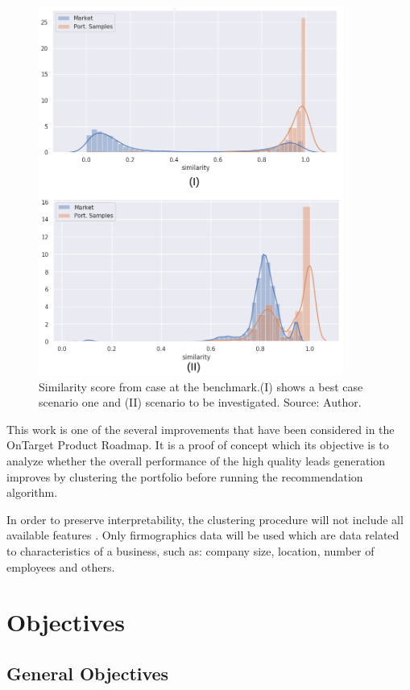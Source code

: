 \begin{figure}
   \centering
   \includegraphics[width=10cm]{fig/ch1-simi-dist-expected-real.png} 
   \caption{Similarity score from case at the benchmark.(I) shows a best case scenario one and (II) scenario to be investigated. Source: Author.}
   \label{fig:simi-dist-expected-real}
\end{figure}

This work is one of the several improvements that have been considered in the OnTarget Product Roadmap. It is a proof of concept which its objective is to analyze whether the overall performance of the high quality leads generation improves by clustering the portfolio before running the recommendation algorithm. 

In order to preserve interpretability, the clustering procedure will not include all available features . Only firmographics data will be used \cite{wikipedia_firmographics} which are data related to characteristics of a business, such as: company size, location, number of employees and others.


\section{Objectives}

\subsection{General Objectives}

